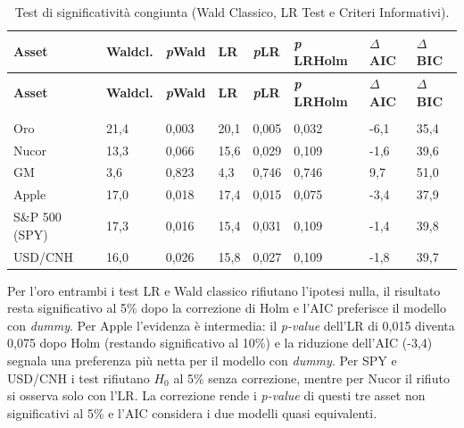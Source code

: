 {
\footnotesize
\begin{longtable}{ p{} p{} p{} p{} p{} p{} p{} p{} }
    \toprule
    \textbf{Asset} & \textbf{Wald\newline cl.} & \textbf{\emph{p}\newline Wald} & \textbf{LR} & \textbf{\emph{p}\newline LR} & \textbf{\emph{p} LR\newline Holm} & \textbf{$\Delta$AIC} & \textbf{$\Delta$BIC} \\
    \midrule
    \endfirsthead
    \toprule
    \textbf{Asset} & \textbf{Wald\newline cl.} & \textbf{\emph{p}\newline Wald} & \textbf{LR} & \textbf{\emph{p}\newline LR} & \textbf{\emph{p} LR\newline Holm} & \textbf{$\Delta$AIC} & \textbf{$\Delta$BIC} \\
    \midrule
    \endhead
    \midrule
    \noalign{\vspace{10pt}}
    \caption[]{Test di significatività congiunta.} \\
    \endfoot
    \bottomrule
    \noalign{\vspace{10pt}}
    \caption{Test di significatività congiunta (Wald Classico, LR Test e Criteri Informativi).}
    \label{tab:test-congiunti}
    \endlastfoot
    Oro & 21,4 & 0,003 & 20,1 & 0,005 & 0,032 & -6,1 & 35,4 \\ \midrule
    Nucor & 13,3 & 0,066 & 15,6 & 0,029 & 0,109 & -1,6 & 39,6 \\ \midrule
    GM & 3,6 & 0,823 & 4,3 & 0,746 & 0,746 & 9,7 & 51,0 \\ \midrule
    Apple & 17,0 & 0,018 & 17,4 & 0,015 & 0,075 & -3,4 & 37,9 \\ \midrule
    S\&P 500 (SPY) & 17,3 & 0,016 & 15,4 & 0,031 & 0,109 & -1,4 & 39,8 \\ \midrule
    USD/\newline CNH & 16,0 & 0,026 & 15,8 & 0,027 & 0,109 & -1,8 & 39,7 \\
\end{longtable}
}

Per l'oro entrambi i test LR e Wald classico rifiutano l'ipotesi nulla, il risultato resta significativo al 5\% dopo la correzione di Holm e l'AIC preferisce il modello 
con \emph{dummy}. Per Apple l'evidenza è intermedia: il \emph{p-value} dell'LR di 0,015 diventa 0,075 dopo Holm (restando significativo al 10\%) e la riduzione dell'AIC (-3,4) 
segnala una preferenza più netta per il modello con \emph{dummy}. Per SPY e USD/CNH i test rifiutano $H_0$ al 5\% senza correzione, mentre per Nucor il rifiuto si 
osserva solo con l'LR. La correzione rende i \emph{p-value} di questi tre asset non significativi al 5\% e l'AIC considera i due modelli quasi equivalenti. 

